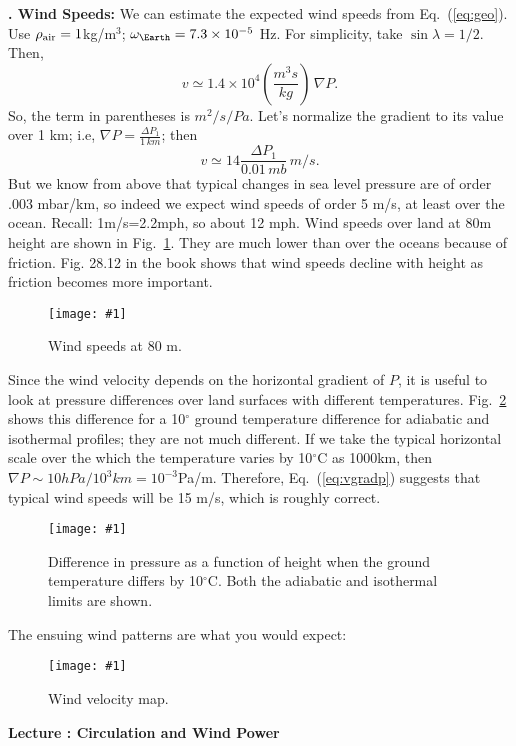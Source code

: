 \documentclass[11pt]{book}
\def\be{\begin{equation}}
\def\ee{\end{equation}}
\newcommand{\ec}[1]{Eq.~(\ref{eq:#1})}
\newcommand{\eql}[1]{\label{eq:#1}}
\newcommand{\sfig}[2]{
\texttt{[image: \#1]}
        }
\newcommand{\Spng}[2]{
   \begin{figure}[thbp]
   \begin{center}
    \sfig{../Figures/#1.png}{0.7\columnwidth}
    \caption{{\small #2}}
    \label{fig:#1}
     \end{center}
   \end{figure}
}
\newcommand{\rf}[1]{\ref{fig:#1}}
\newcommand\lecture[1]{\newpage
\addtocounter{lectureno}{1}
\setcounter{secno}{0}
\begin{center}
 {\bf Lecture \arabic{lectureno}: #1}
\end{center}
}
\newcounter{lectureno}
\newcounter{secno}
\newcommand\lsection[1]{
\addtocounter{secno}{1}
{\bf \arabic{lectureno}.\alph{secno} #1:}}
\begin{document}
\lsection{Wind Speeds}
We can estimate the expected wind speeds from \ec{geo}. Use $\rho_{\rm air}=1$kg/m$^3$; $\omega_\Earth= 7.3\times 10^{-5}$ Hz. For simplicity, take $\sin\lambda=1/2$. Then,
\be
v \simeq 1.4\times 10^4 \left( \frac{m^3 s}{kg}\right)\, \nabla P.\eql{vgradp}\ee
So, the term in parentheses is
$m^2/s/Pa$. Let's normalize the gradient to its value over 1 km; i.e, $\nabla P =\frac{\Delta P_1}{1\,km}$; then
\be
v\simeq 14 \frac{\Delta P_1}{0.01\, mb}\, m/s 
.\ee
But we know from above that typical changes in sea level pressure are of order .003 mbar/km, so indeed we expect wind speeds of order 5 m/s, at least over the ocean. Recall: 1m/s=2.2mph, so about 12 mph.
Wind speeds over land at 80m height are shown in Fig.~\rf{wind80}. They are much lower than over the oceans because of friction.
Fig. 28.12 in the book shows that wind speeds decline with height as friction becomes more important.
\Spng{wind80}{Wind speeds at 80 m.} 

Since the wind velocity depends on the horizontal gradient of $P$, it is useful to look at pressure differences over land surfaces with different temperatures. Fig.~\rf{dpdt} shows this difference for a 10$^\circ$ ground temperature difference for adiabatic and isothermal profiles; they are not much different. If we take the typical horizontal scale over the which the temperature varies by 10$^\circ$C as 1000km, then $\nabla P\sim 10hPa/10^3km = 10^{-3}$Pa/m. Therefore, \ec{vgradp} suggests that typical wind speeds will be 15 m/s, which is roughly correct.
\Spng{dpdt}{Difference in pressure as a function of height when the ground temperature differs by 10$^\circ$C. Both the adiabatic and isothermal limits  are shown.}

The ensuing wind patterns are what you would expect: 
\Spng{windspeed}{Wind velocity map.}



\lecture{Circulation and Wind Power}
\end{document}
